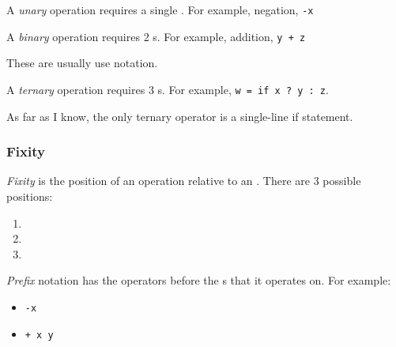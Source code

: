 \begin{definition}[Unary]\label{def:Arity-Unary}
  A \emph{unary} operation requires a single .
  For example, negation, \texttt{-x}
\end{definition}

\begin{definition}[Binary]\label{def:Arity-Binary}
  A \emph{binary} operation requires 2 s.
  For example, addition, \texttt{y + z}

  \begin{remark}
    These are usually use  notation.
  \end{remark}
\end{definition}

\begin{definition}[Ternary]\label{def:Arity-Ternary}
  A \emph{ternary} operation requires 3 s.
  For example, \verb|w = if x ? y : z|.

  \begin{remark}
    As far as I know, the only ternary operator is a single-line if statement.
  \end{remark}
\end{definition}

\subsubsection{Fixity}\label{subsubsec:Operator_Fixity} %
\begin{definition}[Fixity]\label{def:Fixity}
  \emph{Fixity} is the position of an operation relative to an .
  There are 3 possible positions:
  \begin{enumerate}[noitemsep]
  \item {}
  \item {}
  \item {}
  \end{enumerate}
\end{definition}

\begin{definition}[Prefix]\label{def:Fixity-Prefix}
  \emph{Prefix} notation has the operators before the s that it operates on.
  For example:
  \begin{itemize}[noitemsep]
  \item \texttt{-x}
  \item \texttt{+ x y}
  \end{itemize}
\end{definition}

